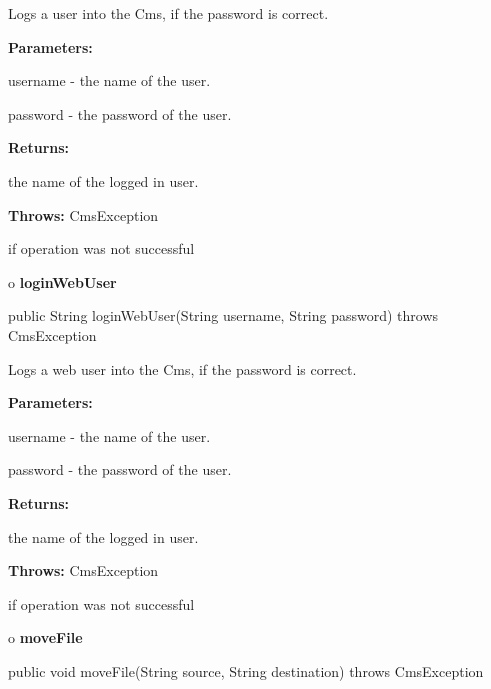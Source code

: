 \begin{description}
\htmlDD Logs a user into the Cms, if the password is correct.

\begin{description}
\item {\bf Parameters:}

username - the name of the user.

password - the password of the user.
\item {\bf Returns:}

the name of the logged in user.
\item {\bf Throws:} CmsException

if operation was not successful
\end{description}

\end{description}

o {\bf loginWebUser}

\begin{PRE}
 public String loginWebUser(String username,
                            String password) throws CmsException
\end{PRE}

\begin{description}
\htmlDD Logs a web user into the Cms, if the password is correct.

\begin{description}
\item {\bf Parameters:}

username - the name of the user.

password - the password of the user.
\item {\bf Returns:}

the name of the logged in user.
\item {\bf Throws:} CmsException

if operation was not successful
\end{description}

\end{description}

o {\bf moveFile}

\begin{PRE}
 public void moveFile(String source,
                      String destination) throws CmsException
\end{PRE}

